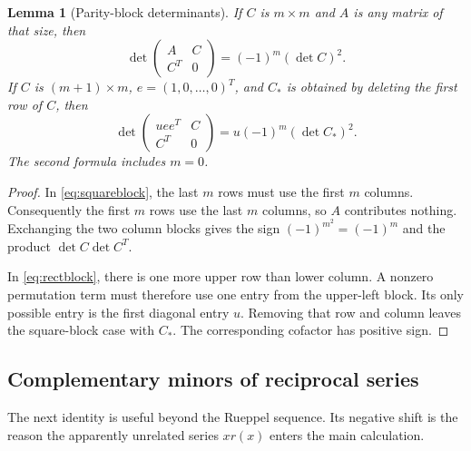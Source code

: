 \documentclass[11pt,a4paper]{article}
\numberwithin{equation}{section}
\newtheorem{lemma}[theorem]{Lemma}
\theoremstyle{definition}
\theoremstyle{remark}
\newcommand{\C}{\mathbb C}
\begin{document}
\begin{lemma}[Parity-block determinants]\label{lem:antiblock}
If $C$ is $m\times m$ and $A$ is any matrix of that size, then
\begin{equation}\label{eq:squareblock}
 \det\begin{pmatrix}A&C\\C^T&0\end{pmatrix}
 =(-1)^m(\det C)^2.
\end{equation}
If $C$ is $(m+1)\times m$, $e=(1,0,\ldots,0)^T$, and $C_*$ is obtained
by deleting the first row of $C$, then
\begin{equation}\label{eq:rectblock}
 \det\begin{pmatrix}u e e^T&C\\C^T&0\end{pmatrix}
 =u(-1)^m(\det C_*)^2.
\end{equation}
The second formula includes $m=0$.
\end{lemma}
\begin{proof}
In \eqref{eq:squareblock}, the last $m$ rows must use the first $m$
columns. Consequently the first $m$ rows use the last $m$ columns,
so $A$ contributes nothing. Exchanging the two column blocks gives
the sign $(-1)^{m^2}=(-1)^m$ and the product $\det C\det C^T$.

In \eqref{eq:rectblock}, there is one more upper row than lower column.
A nonzero permutation term must therefore use one entry from the
upper-left block. Its only possible entry is the first diagonal
entry $u$. Removing that row and column leaves the square-block
case with $C_*$. The corresponding cofactor has positive sign.
\end{proof}

\subsection{Complementary minors of reciprocal series}

The next identity is useful beyond the Rueppel sequence. Its negative
shift is the reason the apparently unrelated series $xr(x)$ enters the
main calculation.
\end{document}
